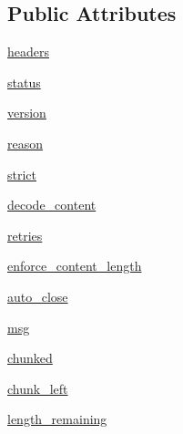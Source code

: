 \subsection*{Public Attributes}
\begin{DoxyCompactItemize}
\item 
\hyperlink{classpip_1_1__vendor_1_1urllib3_1_1response_1_1HTTPResponse_a97aabd98d1005d93e6b28dc90079c103}{headers}
\item 
\hyperlink{classpip_1_1__vendor_1_1urllib3_1_1response_1_1HTTPResponse_abb4b68e446ded37f5dd525479a03e1fa}{status}
\item 
\hyperlink{classpip_1_1__vendor_1_1urllib3_1_1response_1_1HTTPResponse_ab3339932611c370ff5995941d5719307}{version}
\item 
\hyperlink{classpip_1_1__vendor_1_1urllib3_1_1response_1_1HTTPResponse_a3453f7b7594608da4f5c48c4826cc22a}{reason}
\item 
\hyperlink{classpip_1_1__vendor_1_1urllib3_1_1response_1_1HTTPResponse_a9a7271c6578247ee75f5d45c38748224}{strict}
\item 
\hyperlink{classpip_1_1__vendor_1_1urllib3_1_1response_1_1HTTPResponse_a549e8dc33482f73e462d07d9816ab257}{decode\+\_\+content}
\item 
\hyperlink{classpip_1_1__vendor_1_1urllib3_1_1response_1_1HTTPResponse_a3d94baaf4a85948efe585d958b548801}{retries}
\item 
\hyperlink{classpip_1_1__vendor_1_1urllib3_1_1response_1_1HTTPResponse_ac76d60165511ffc85e85713d6e9fbd54}{enforce\+\_\+content\+\_\+length}
\item 
\hyperlink{classpip_1_1__vendor_1_1urllib3_1_1response_1_1HTTPResponse_a6d44c2eca87a45b0d06ffc4461ac053f}{auto\+\_\+close}
\item 
\hyperlink{classpip_1_1__vendor_1_1urllib3_1_1response_1_1HTTPResponse_a92c2244c3b2203137beceafc12392502}{msg}
\item 
\hyperlink{classpip_1_1__vendor_1_1urllib3_1_1response_1_1HTTPResponse_ae1a5bd0eb4e4c778b5763efbef97d2a4}{chunked}
\item 
\hyperlink{classpip_1_1__vendor_1_1urllib3_1_1response_1_1HTTPResponse_a220933a66b25c8200f985b85cd3d19b4}{chunk\+\_\+left}
\item 
\hyperlink{classpip_1_1__vendor_1_1urllib3_1_1response_1_1HTTPResponse_a625b8556a44e2c240465d48b8286a4c1}{length\+\_\+remaining}
\end{DoxyCompactItemize}
